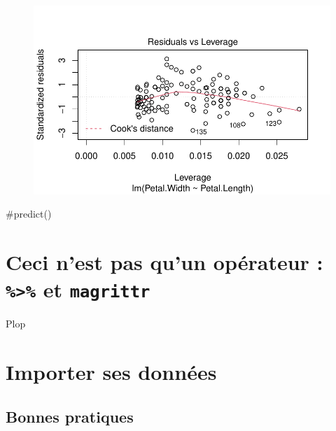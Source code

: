 \documentclass[
  letterpaper,
  DIV=11,
  numbers=noendperiod]{scrreprt}
\newenvironment{Shaded}{\begin{snugshade}}{\end{snugshade}}
\newcommand{\CommentTok}[1]{\textcolor[rgb]{0.37,0.37,0.37}{#1}}
\begin{document}
\begin{figure}[H]

{\centering \includegraphics{modelling_files/figure-pdf/unnamed-chunk-3-4.pdf}

}

\end{figure}

\begin{Shaded}
\begin{Highlighting}[]
\CommentTok{\#predict()}
\end{Highlighting}
\end{Shaded}


\hypertarget{ceci-nest-pas-quun-opuxe9rateur-et-magrittr}{%
\chapter{\texorpdfstring{Ceci n'est pas qu'un opérateur :
\texttt{\%\textgreater{}\%} et
\texttt{magrittr}}{Ceci n'est pas qu'un opérateur : \%\textgreater\% et magrittr}}\label{ceci-nest-pas-quun-opuxe9rateur-et-magrittr}}

Plop


\hypertarget{importer-ses-donnuxe9es}{%
\chapter{Importer ses données}\label{importer-ses-donnuxe9es}}

\hypertarget{bonnes-pratiques}{%
\section{Bonnes pratiques}\label{bonnes-pratiques}}
\end{document}
